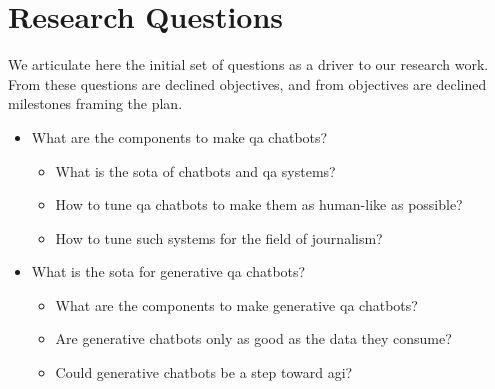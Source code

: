 \section{Research Questions}
We articulate here the initial set of questions as a driver to our research work. From these questions are declined objectives, and from objectives are declined milestones framing the plan.

\begin{itemize}[noitemsep]
    \item What are the components to make \gls{qa} chatbots?
    \begin{itemize}[noitemsep]
        \item What is the \gls{sota} of chatbots and \gls{qa} systems?
        \item How to tune \gls{qa} chatbots to make them as human-like as possible?
        \item How to tune such systems for the field of journalism?
    \end{itemize}
    \item What is the \gls{sota} for \gls{generative} \gls{qa} chatbots?
    \begin{itemize}[noitemsep]
        \item What are the components to make \gls{generative} \gls{qa} chatbots?
        \item Are \gls{generative} chatbots only as good as the data they consume?
        \item Could \gls{generative} chatbots be a step toward \gls{agi}?
    \end{itemize}
\end{itemize}


